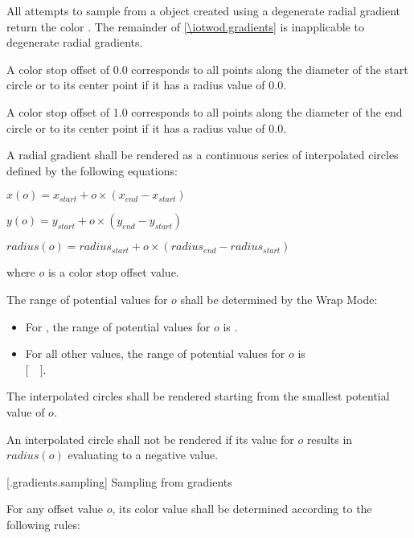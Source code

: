 \pnum
All attempts to sample from a  object created using a degenerate radial gradient return the color . The remainder of \ref{\iotwod.gradients} is inapplicable to degenerate radial gradients.

\pnum
A color stop offset of 0.0 corresponds to all points along the diameter of the start circle or to its center point if it has a radius value of 0.0.

\pnum
A color stop offset of 1.0 corresponds to all points along the diameter of the end circle or to its center point if it has a radius value of 0.0.

\pnum
A radial gradient shall be rendered as a continuous series of interpolated circles defined by the following equations:
\begin{enumeratea}
\item $x(o) = x_{start} + o \times (x_{end} - x_{start})$
\item $y(o) = y_{start} + o \times (y_{end} - y_{start})$
\item $radius(o) = radius_{start} + o \times (radius_{end} - radius_{start})$
\end{enumeratea}
where $o$ is a color stop offset value.

\pnum
The range of potential values for $o$ shall be determined by the Wrap Mode:
\begin{itemize}
\item For , the range of potential values for $o$ is .
\item For all other  values, the range of potential values for $o$ is\\ $[$~~$]$.
\end{itemize}

\pnum
The interpolated circles shall be rendered starting from the smallest potential value of $o$.

\pnum
An interpolated circle shall not be rendered if its value for $o$ results in $radius(o)$ evaluating to a negative value.

 [\iotwod.gradients.sampling] {Sampling from gradients}

\pnum
For any offset value $o$, its color value shall be determined according to the following rules:

